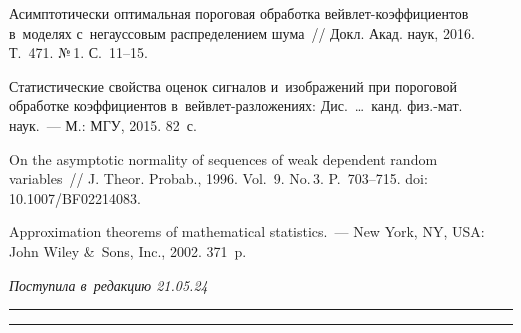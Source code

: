 \begin{multicols}{2}
{{\begin{thebibliography}{99}
Асимптотически оптимальная пороговая обработка вейв\-лет-ко\-эф\-фи\-ци\-ен\-тов в~моделях с~негауссовым распределением шума~// Докл. Акад. наук, 2016. Т.~471. №\,1. 
С.~11--15.



Статистические свойства оценок сигналов и~изображений при пороговой обработке 
коэффициентов в~вейв\-лет-раз\-ло\-же\-ни\-ях: Дис.\ \ldots\ канд. физ.-мат. наук.~--- 
М.: МГУ, 2015. 82~с.

On the asymptotic normality of sequences of weak dependent random variables~// 
J. Theor. Probab., 1996. Vol.~9. No.\,3. P.~703--715. doi: 10.1007/BF02214083.

Approximation theorems of mathematical statistics.~--- New York, NY, USA: John Wiley \&~Sons, Inc., 2002. 371~p.

\end{thebibliography}

 }
 }

\end{multicols}

\vspace*{-6pt}

\hfill{\small\textit{Поступила в~редакцию 21.05.24}}

\vspace*{8pt}




\hrule

\vspace*{2pt}

\hrule



\def\tit{ASYMPTOTIC NORMALITY AND STRONG CONSISTENCY\\ OF~RISK ESTIMATE WHEN USING THE~FDR THRESHOLD\\ UNDER WEAK DEPENDENCE CONDITION}


\def\titkol{Asymptotic normality and strong consistency of~risk estimate when using the~FDR threshold under weak dependence condition}


\def\aut{M.\,O.~Vorontsov$^{1,2}$ and~O.\,V.~Shestakov$^{1,2,3}$}

\def\autkol{M.\,O.~Vorontsov and~O.\,V.~Shestakov}

